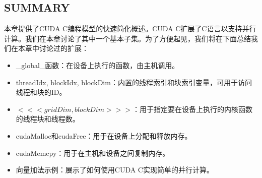 \documentclass[11pt]{ctexart}
\begin{document}
\subsection{SUMMARY}

本章提供了CUDA C编程模型的快速简化概述。CUDA C扩展了C语言以支持并行计算。我们在本章讨论了其中一个基本子集。为了方便起见，我们将在下面总结我们在本章中讨论过的扩展：
\begin{itemize}
	\item \_global\_函数：在设备上执行的函数，由主机调用。
	\item threadIdx, blockIdx, blockDim：内置的线程索引和块索引变量，可用于访问线程和块的ID。
	\item $<<<gridDim, blockDim>>>$：用于指定要在设备上执行的内核函数的线程块和线程数。
	\item cudaMalloc和cudaFree：用于在设备上分配和释放内存。
	\item cudaMemcpy：用于在主机和设备之间复制内存。
	\item 向量加法示例：展示了如何使用CUDA C实现简单的并行计算。
\end{itemize}
\end{document}
